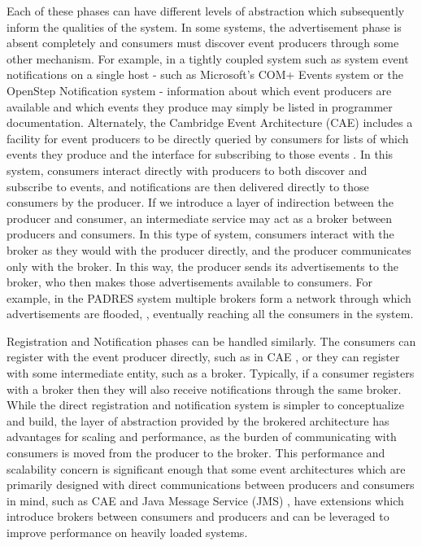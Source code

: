 \documentclass{acm_proc_article-sp}
\begin{document}
Each of these phases can have different levels of abstraction which subsequently inform the qualities of the system. In some systems, the advertisement phase is absent completely and consumers must discover event producers through some other mechanism. For example, in a tightly coupled system such as system event notifications on a single host - such as Microsoft's COM+ Events system or the OpenStep Notification system - information about which event producers are available and which events they produce may simply be listed in programmer documentation. Alternately, the Cambridge Event Architecture (CAE) includes a facility for event producers to be directly queried by consumers for lists of which events they produce and the interface for subscribing to those events \cite{Bacon:2000p6818}. In this system, consumers interact directly with producers to both discover and subscribe to events, and notifications are then delivered directly to those consumers by the producer. If we introduce a layer of indirection between the producer and consumer, an intermediate service may act as a broker between producers and consumers. In this type of system, consumers interact with the broker as they would with the producer directly, and the producer communicates only with the broker. In this way, the producer sends its advertisements to the broker, who then makes those advertisements available to consumers. For example, in the PADRES system multiple brokers form a network through which advertisements are flooded, \cite{Jacobsen:2010p8313}, eventually reaching all the consumers in the system.

Registration and Notification phases can be handled similarly. The consumers can register with the event producer directly, such as in CAE \cite{Bacon:2000p6818}, or they can register with some intermediate entity, such as a broker. Typically, if a consumer registers with a broker then they will also receive notifications through the same broker. While the direct registration and notification system is simpler to conceptualize and build, the layer of abstraction provided by the brokered architecture has advantages for scaling and performance, as the burden of communicating with consumers is moved from the producer to the broker. This performance and scalability concern is significant enough that some event architectures which are primarily designed with direct communications between producers and consumers in mind, such as CAE \cite{Bacon:2000p6818} and Java Message Service (JMS) \cite{Oracle:2002p8432}, have extensions which introduce brokers between consumers and producers and can be leveraged to improve performance on heavily loaded systems.
\end{document}
